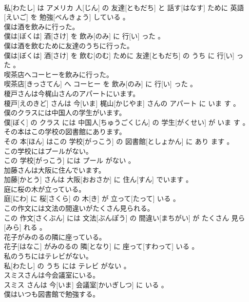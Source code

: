 \documentclass[8pt]{extreport}
\begin{document}
\begin{CJK}{UTF8}{min}
\\	私[わたし] は アメリカ 人[じん] の 友達[ともだち] と 話す[はなす] ために 英語[えいご] を 勉強[べんきょう] している 。
\\	僕は酒を飲みに行った。	
\\	僕は[ぼくは] 酒[さけ] を 飲み[のみ] に 行[い] った 。
\\	僕は酒を飲むために友達のうちに行った。	
\\	僕は[ぼくは] 酒[さけ] を 飲む[のむ] ために 友達[ともだち] の うち に 行[い] った 。
\\	喫茶店へコーヒーを飲みに行った。	
\\	喫茶店[きっさてん] へ コーヒー を 飲み[のみ] に 行[い] った 。
\\	榎戸さんは今梶山さんのアパートにいます。	
\\	榎戸[えのきど] さんは 今[いま] 梶山[かじやま] さんの アパート に いま す 。
\\	僕のクラスには中国人の学生がいます。	
\\	僕[ぼく] の クラス には 中国人[ちゅうごくじん] の 学生[がくせい] が いま す 。
\\	その本はこの学校の図書館にあります。	
\\	その 本[ほん] はこの 学校[がっこう] の 図書館[としょかん] に あり ます 。
\\	この学校にはプールがない。	
\\	この 学校[がっこう] には プール がない 。
\\	加藤さんは大阪に住んでいます。	
\\	加藤[かとう] さんは 大阪[おおさか] に 住ん[すん] でいます 。
\\	庭に桜の木が立っている。	
\\	庭[にわ] に 桜[さくら] の 木[き] が 立って[たって] いる 。
\\	この作文には文法の間違いがたくさん見られる。	
\\	この 作文[さくぶん] には 文法[ぶんぽう] の 間違い[まちがい] が たくさん 見ら[みら] れる 。
\\	花子がみのるの隣に座っている。	
\\	花子[はなこ] がみのるの 隣[となり] に 座って[すわって] いる 。
\\	私のうちにはテレビがない。	
\\	私[わたし] の うち には テレビ がない 。
\\	スミスさんは今会議室にいる。	
\\	スミス さんは 今[いま] 会議室[かいぎしつ] に いる 。
\\	僕はいつも図書館で勉強する。	

\end{CJK}
\end{document}
